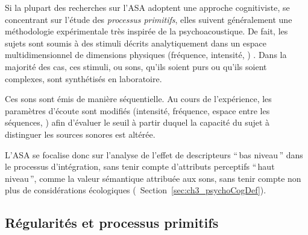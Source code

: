 Si la plupart des recherches sur l'ASA adoptent une approche cognitiviste, se concentrant sur l'étude des \emph{processus primitifs}, elles suivent généralement une méthodologie expérimentale très inspirée de la psychoacoustique. De fait, les sujets sont soumis à des stimuli décrits analytiquement dans un espace multidimensionnel de dimensions physiques (fréquence, intensité, \etc) \citep{dubois2006cognitive}. Dans la majorité des cas, ces stimuli, ou sons, qu'ils soient purs ou qu'ils soient complexes, sont synthétisés en laboratoire.

Ces sons sont émis de manière séquentielle. Au cours de l'expérience, les paramètres d'écoute sont modifiés (intensité, fréquence, espace entre les séquences, \etc) afin d'évaluer le seuil à partir duquel la capacité du sujet à distinguer les sources sonores est altérée.

L'ASA se focalise donc sur l'analyse de l'effet de descripteurs ``\,bas niveau\,'' dans le processus d'intégration, sans tenir compte d'attributs perceptifs ``\,haut niveau\,'', comme la valeur sémantique attribuée aux sons, sans tenir compte non plus de considérations écologiques (\cf~Section~\ref{sec:ch3_psychoCogDef}). 

\subsection{Régularités et processus primitifs}
\label{sec:ch3_regularitesEtProcessusPrimitifs}

